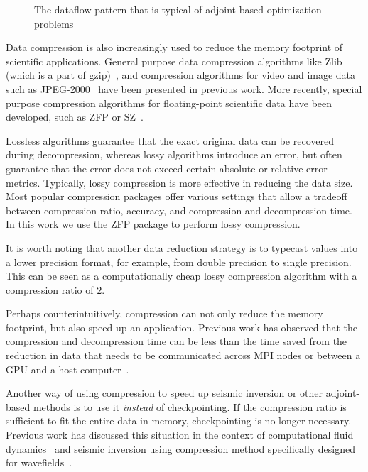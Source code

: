 \documentclass[conference]{IEEEtran}
\begin{document}
\begin{figure}
\begin{center}

\end{center}
\caption{The dataflow pattern that is typical of adjoint-based optimization problems}
\label{fig:dataflow}
\end{figure}


Data compression is also increasingly used to reduce the memory footprint of
scientific applications. General purpose data compression algorithms like Zlib
(which is a part of gzip)~\cite{deutsch1996zlib}, and compression algorithms for
video and image data such as JPEG-2000~\cite{skodras2001jpeg} have been
presented in previous work. More recently, special purpose compression
algorithms for floating-point scientific data have been developed, such as ZFP
or SZ~\cite{Kaklamanis:2012aa,lindstrom2014fixed,di2018efficient}.

Lossless algorithms guarantee that the exact original data can be recovered
during decompression, whereas lossy algorithms introduce an error, but often
guarantee that the error does not exceed certain absolute or relative error
metrics. Typically, lossy compression is more effective in reducing the data
size. Most popular compression packages offer various settings that allow a
tradeoff between compression ratio, accuracy, and compression and decompression
time. In this work we use the ZFP package to perform lossy compression.

It is worth noting that another data reduction strategy is to typecast values
into a lower precision format, for example, from double precision to single
precision. This can be seen as a computationally cheap lossy compression
algorithm with a compression ratio of $2$.

Perhaps counterintuitively, compression can not only reduce the memory
footprint, but also speed up an application. Previous work has observed that the
compression and decompression time can be less than the time saved from the
reduction in data that needs to be communicated across MPI nodes or between a
GPU and a host computer~\cite{gpu-compression}.

Another way of using compression to speed up seismic inversion or other adjoint-based methods is to use it \emph{instead} of checkpointing. If the compression ratio is sufficient to fit the entire data in memory, checkpointing is no longer necessary. Previous work has discussed this situation in the context of computational fluid dynamics~\cite{cyr2015towards} and seismic inversion using compression method specifically designed for
wavefields~\cite{dalmau2014lossy,boehm2016wavefield}.
\end{document}
